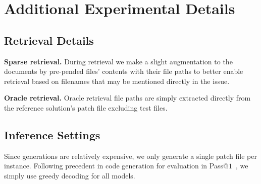 \section{Additional Experimental Details}
\label{appx:experiment-details}

\subsection{Retrieval Details}
\label{appx:retrieval}

\textbf{Sparse retrieval.}
During retrieval we make a slight augmentation to the documents by pre-pended files' contents with their file paths to better enable retrieval based on filenames that may be mentioned directly in the issue.

\textbf{Oracle retrieval.}
Oracle retrieval file paths are simply extracted directly from the reference solution's patch file excluding test files.

\subsection{Inference Settings}
Since generations are relatively expensive, we only generate a single patch file per instance. Following precedent in code generation for evaluation in Pass@$1$~\citep{chen2021evaluating,rozière2023code}, we simply use greedy decoding for all models.

